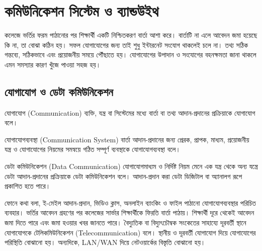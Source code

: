 \begingroup
\chTwoReadableTopicStyle

\section{কমিউনিকেশন সিস্টেম ও ব্যান্ডউইথ}
\label{ch2:communication-bandwidth}
কলেজে ভর্তির ফরম পাঠানোর পর শিক্ষার্থী একটি নিশ্চিতকরণ বার্তা আশা করে। বার্তাটি না এলে আবেদন জমা হয়েছে কি না, তা বোঝা কঠিন হয়। সফল যোগাযোগের জন্য তাই শুধু ইন্টারনেট সংযোগ থাকলেই চলে না। তথ্য সঠিক গন্তব্যে, সঠিকভাবে এবং প্রয়োজনীয় সময়ে পৌঁছাতে হয়। যোগাযোগের উপাদান ও সংযোগের বহনক্ষমতা জানা থাকলে এমন সমস্যার কারণ খুঁজে পাওয়া সহজ হয়।

\subsection{যোগাযোগ ও ডেটা কমিউনিকেশন}
\label{ch2:c01-01}
\begin{definitionbox}{যোগাযোগ (Communication)}
ব্যক্তি, যন্ত্র বা সিস্টেমের মধ্যে বার্তা বা তথ্য আদান-প্রদানের প্রক্রিয়াকে যোগাযোগ বলে।
\end{definitionbox}
\begin{definitionbox}{যোগাযোগব্যবস্থা (Communication System)}
বার্তা আদান-প্রদানের জন্য প্রেরক, প্রাপক, মাধ্যম, প্রয়োজনীয় যন্ত্র ও যোগাযোগের নিয়মের সমন্বয়ে গঠিত সম্পূর্ণ ব্যবস্থাকে যোগাযোগব্যবস্থা বলে।
\end{definitionbox}
\begin{definitionbox}{ডেটা কমিউনিকেশন (Data Communication)}
যোগাযোগমাধ্যম ও নির্দিষ্ট নিয়ম মেনে এক যন্ত্র থেকে অন্য যন্ত্রে ডেটা আদান-প্রদানের প্রক্রিয়াকে ডেটা কমিউনিকেশন বলে। আদান-প্রদান করা ডেটা ডিজিটাল বা অ্যানালগ রূপে প্রকাশিত হতে পারে।
\end{definitionbox}
ফোনে কথা বলা, ই-মেইল আদান-প্রদান, ভিডিও ক্লাস, অনলাইন ব্যাংকিং ও ফাইল পাঠানো যোগাযোগব্যবস্থার পরিচিত ব্যবহার। ভর্তির আবেদন গ্রহণের পর কলেজের সার্ভার শিক্ষার্থীকে ফিরতি বার্তা পাঠায়। শিক্ষার্থী দূরে থেকেই আবেদন জমা দিতে পারে এবং জমা হওয়ার খবর জানতে পারে।
বৈদ্যুতিক বা বিদ্যুৎচৌম্বক সংকেতের সাহায্যে দূরবর্তী স্থানে যোগাযোগকে টেলিকমিউনিকেশন (Telecommunication) বলে। স্থানীয় ও দূরবর্তী যোগাযোগ দিয়ে যোগাযোগের পরিস্থিতি বোঝানো হয়। অন্যদিকে, LAN/WAN দিয়ে নেটওয়ার্কের বিস্তৃতি বোঝানো হয়।


